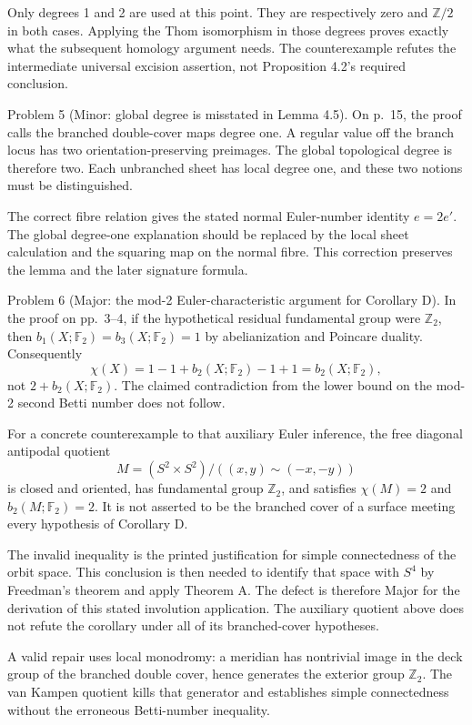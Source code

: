 \documentclass[10pt]{article}
\begin{document}
Only degrees 1 and 2 are used at this point. They are respectively zero and \(\mathbb Z/2\) in both cases. Applying the Thom isomorphism in those degrees proves exactly what the subsequent homology argument needs. The counterexample refutes the intermediate universal excision assertion, not Proposition 4.2’s required conclusion.\par
Problem 5 (Minor: global degree is misstated in Lemma 4.5).  On p. 15, the proof calls the branched double-cover maps degree one. A regular value off the branch locus has two orientation-preserving preimages. The global topological degree is therefore two. Each unbranched sheet has local degree one, and these two notions must be distinguished.\par
The correct fibre relation gives the stated normal Euler-number identity \(e=2e'\). The global degree-one explanation should be replaced by the local sheet calculation and the squaring map on the normal fibre. This correction preserves the lemma and the later signature formula.\par
Problem 6 (Major: the mod-2 Euler-characteristic argument for Corollary D).  In the proof on pp. 3–4, if the hypothetical residual fundamental group were \(\mathbb Z_2\), then \(b_1(X;\mathbb F_2)=b_3(X;\mathbb F_2)=1\) by abelianization and Poincare duality. Consequently \[\chi(X)=1-1+b_2(X;\mathbb F_2)-1+1=b_2(X;\mathbb F_2),\] not \(2+b_2(X;\mathbb F_2)\). The claimed contradiction from the lower bound on the mod-2 second Betti number does not follow.\par
For a concrete counterexample to that auxiliary Euler inference, the free diagonal antipodal quotient \[M=(S^2\times S^2)/((x,y)\sim(-x,-y))\] is closed and oriented, has fundamental group \(\mathbb Z_2\), and satisfies \(\chi(M)=2\) and \(b_2(M;\mathbb F_2)=2\). It is not asserted to be the branched cover of a surface meeting every hypothesis of Corollary D.\par
The invalid inequality is the printed justification for simple connectedness of the orbit space. This conclusion is then needed to identify that space with \(S^4\) by Freedman’s theorem and apply Theorem A. The defect is therefore Major for the derivation of this stated involution application. The auxiliary quotient above does not refute the corollary under all of its branched-cover hypotheses.\par
A valid repair uses local monodromy: a meridian has nontrivial image in the deck group of the branched double cover, hence generates the exterior group \(\mathbb Z_2\). The van Kampen quotient kills that generator and establishes simple connectedness without the erroneous Betti-number inequality.\par
\end{document}
